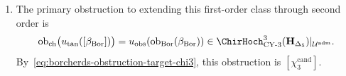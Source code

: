 \begin{theorem}
\begin{enumerate}[label=\textup{(\roman*)}]
\begin{equation}
 \;\simeq\;
 \LMC_{\TangCplx_{\mathbf H_{\Delta_5}}^{\mathrm{ch}}}
 \;:\;
 \dgArt\to\mathrm{Grpd}_\infty.
 \end{equation}
 First-order gauge-equivalence classes at the base point form
 \[
 H^1\!\left(\TangCplx_{\mathbf H_{\Delta_5}}^{\mathrm{ch}}\right)
 =\ChirHoch^2_{\mathrm{CY\text{-}3}}(\mathbf H_{\Delta_5})|_{\Uadm}.
 \]
 The class transported from the Borcherds source is
 $u_{\mathrm{tan}}([\beta_{\mathrm{Bor}}])$.
 \item The primary obstruction to extending this first-order class
 through second order is
 \[
 \operatorname{ob}_{\mathrm{ch}}
 \bigl(u_{\mathrm{tan}}([\beta_{\mathrm{Bor}}])\bigr)
 =u_{\mathrm{obs}}\!\left(
 \operatorname{ob}_{\mathrm{Bor}}(\beta_{\mathrm{Bor}})\right)
 \in
 \ChirHoch^3_{\mathrm{CY\text{-}3}}(\mathbf H_{\Delta_5})|_{\Uadm}.
 \]
 By~\eqref{eq:borcherds-obstruction-target-chi3}, this obstruction is
 $[\chi_3^{\mathrm{cand}}]$.
\end{enumerate}
\end{theorem}

